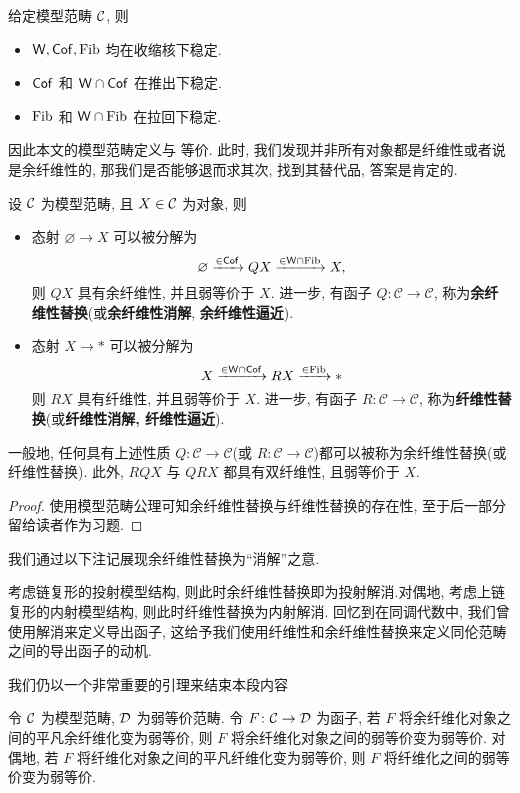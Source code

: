 \begin{proposition}\label{命题:模型范畴基本性质}
    给定模型范畴 $\cal{C}$, 则
    \begin{itemize}
        \item $\mathsf{W},\mathsf{Cof},\operatorname{Fib}$ 均在收缩核下稳定.
        \item $\mathsf{Cof}$ 和 $\mathsf{W} \cap \mathsf{Cof}$ 在推出下稳定.
        \item $\operatorname{Fib}$ 和 $\mathsf{W} \cap \operatorname{Fib}$ 在拉回下稳定.
    \end{itemize}
\end{proposition}
因此本文的模型范畴定义与 \cite[Definition 1.1.3.]{Hovey} 等价.
此时, 我们发现并非所有对象都是纤维性或者说是余纤维性的, 那我们是否能够退而求其次, 找到其替代品, 答案是肯定的.
\begin{definition}[(余)纤维性替换]
设 $\cal{C}$ 为模型范畴, 且 $X\in \cal{C}$ 为对象, 则
\begin{itemize}
    \item 态射 $\varnothing \to X$ 可以被分解为
    \[
    \varnothing \xrightarrow{\in\mathsf{Cof}} QX \xrightarrow{\in \mathsf{W}\cap \operatorname{Fib}} X,
    \]
    则 $QX$ 具有余纤维性, 并且弱等价于 $X$. 进一步, 有函子 $Q \colon \mathcal{C} \to \mathcal{C}$, 称为\textbf{余纤维性替换}(或\textbf{余纤维性消解}, \textbf{余纤维性逼近}).
    \item 态射 $X \to *$ 可以被分解为
    \[
    X\xrightarrow{\in \mathsf{W}\cap \mathsf{Cof}} RX \xrightarrow{\in \operatorname{Fib}} *
    \]
    则 $RX$ 具有纤维性, 并且弱等价于 $X$. 进一步, 有函子 $R\colon \mathcal{C} \to\mathcal{C}$, 称为\textbf{纤维性替换}(或\textbf{纤维性消解, \textbf{纤维性逼近}}).
\end{itemize}
一般地, 任何具有上述性质 $Q\colon \mathcal{C} \to \mathcal{C}$(或 $R\colon \mathcal{C} \to \mathcal{C}$)都可以被称为余纤维性替换(或纤维性替换). 此外, $RQX$ 与 $QRX$ 都具有双纤维性, 且弱等价于 $X$.
\end{definition}
\begin{proof}
    使用模型范畴公理可知余纤维性替换与纤维性替换的存在性, 至于后一部分留给读者作为习题.
\end{proof}
我们通过以下注记展现余纤维性替换为``消解''之意.
\begin{remark}
    考虑链复形的投射模型结构, 则此时余纤维性替换即为投射解消.对偶地, 考虑上链复形的内射模型结构, 则此时纤维性替换为内射解消. 回忆到在同调代数中, 我们曾使用解消来定义导出函子, 这给予我们使用纤维性和余纤维性替换来定义同伦范畴之间的导出函子的动机.
\end{remark}
我们仍以一个非常重要的引理来结束本段内容
\begin{lemma}\label{引理:Ken Brown's Lemma}
    令 $\cal{C}$ 为模型范畴, $\cal{D}$ 为弱等价范畴. 令 $F\colon \cal{C} \to D$ 为函子, 若 $F$ 将余纤维化对象之间的平凡余纤维化变为弱等价, 则 $F$ 将余纤维化对象之间的弱等价变为弱等价. 对偶地, 若 $F$ 将纤维化对象之间的平凡纤维化变为弱等价, 则 $F$ 将纤维化之间的弱等价变为弱等价.
\end{lemma}
